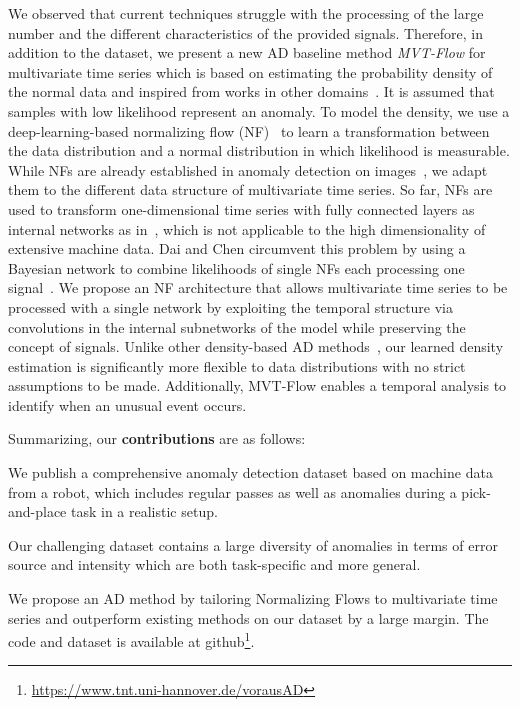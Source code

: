 \documentclass[journal]{IEEEtran}
\newenvironment{packed_enum}{
\begin{itemize}
  \setlength{\itemsep}{3pt}
  \setlength{\parskip}{0pt}
  \setlength{\parsep}{0pt}
}{\end{itemize}}
\begin{document}
{We observed that current techniques struggle} with the processing of the large number and the different characteristics of the provided signals.
Therefore, in addition to the dataset, we present a new AD baseline method \textit{MVT-Flow} for multivariate time series which is based on estimating the probability density of the normal data {and inspired from works in other domains~\cite{csflow, kang2022traffic}}.
It is assumed that samples with low likelihood represent an anomaly.
To model the density, we use a deep-learning-based normalizing flow (NF)~\cite{nf} to learn a transformation between the data distribution and a normal distribution in which likelihood {is} measurable.
While NFs are already established in anomaly detection on images~\cite{differnet, csflow, cflow, yan2022cainnflow}, we adapt them to the different data structure of multivariate time series.
So far, NFs are used to transform one-dimensional time series with fully connected layers as internal networks as in~\cite{nf_time_series}, which is not applicable to the high dimensionality of extensive machine data.
{Dai and Chen circumvent this problem by using a Bayesian network to combine likelihoods of single NFs each processing one signal~\cite{GANF}.}
{We propose an NF architecture that allows multivariate time series to be processed with a single network} by exploiting the temporal structure via convolutions in the internal subnetworks of the model while preserving the concept of signals.
Unlike other density-based AD methods~\cite{romeres2019anomaly, khalastchi2015online}, our learned density estimation is significantly more flexible to data distributions with no strict assumptions to be made.
Additionally, MVT-Flow enables a temporal analysis to identify when an unusual event occurs.

Summarizing, our \textbf{contributions} are as follows:
\begin{packed_enum}
    \item We publish a comprehensive anomaly detection dataset based on machine data from a robot, which includes regular passes as well as anomalies during a pick-and-place task in a realistic setup.
    \item Our challenging dataset contains a large diversity of anomalies in terms of error source and intensity which are both task-specific and more general.
    \item We propose an AD method by tailoring Normalizing Flows to multivariate time series and outperform existing methods on our dataset by a large margin. The code and dataset is available at github\footnote{\url{https://www.tnt.uni-hannover.de/vorausAD}}.
\end{packed_enum}
\end{document}
